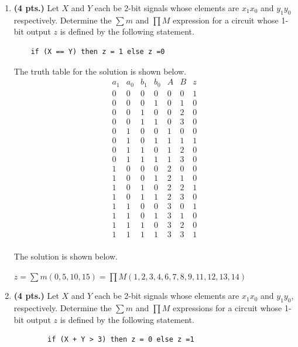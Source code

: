 \begin{enumerate}
\item {\bf (4 pts.)} Let $X$ and $Y$ each be 2-bit signals whose 
elements are $x_1 x_0$ and $y_1 y_0$ respectively.  Determine the 
$\sum m$ and $\prod M$ expression for a circuit whose 1-bit 
output $z$ is defined by the following statement.
\begin{verbatim}
	if (X == Y) then z = 1 else z =0
\end{verbatim}

\begin{solution}{
The truth table for the solution is shown below.
$$\begin{array}{c|c|c|c||c|c||c}
a_1 & a_0 & b_1 & b_0 & A  & B & z  \\ \hline
0 & 0 & 0 & 0 & 0 & 0 & 1  \\ \hline
0 & 0 & 0 & 1 & 0 & 1 & 0  \\ \hline
0 & 0 & 1 & 0 & 0 & 2 & 0  \\ \hline
0 & 0 & 1 & 1 & 0 & 3 & 0  \\ \hline
0 & 1 & 0 & 0 & 1 & 0 & 0  \\ \hline
0 & 1 & 0 & 1 & 1 & 1 & 1  \\ \hline
0 & 1 & 1 & 0 & 1 & 2 & 0  \\ \hline
0 & 1 & 1 & 1 & 1 & 3 & 0  \\ \hline
1 & 0 & 0 & 0 & 2 & 0 & 0  \\ \hline
1 & 0 & 0 & 1 & 2 & 1 & 0  \\ \hline
1 & 0 & 1 & 0 & 2 & 2 & 1  \\ \hline
1 & 0 & 1 & 1 & 2 & 3 & 0  \\ \hline
1 & 1 & 0 & 0 & 3 & 0 & 1  \\ \hline
1 & 1 & 0 & 1 & 3 & 1 & 0  \\ \hline
1 & 1 & 1 & 0 & 3 & 2 & 0  \\ \hline
1 & 1 & 1 & 1 & 3 & 3 & 1  \\
\end{array}$$

The solution is shown below.

$z = \sum m(0,5,10,15) = \prod M(1,2,3,4,6,7,8,9,11,12,13,14)$
} \end{solution}


\item {\bf (4 pts.)} Let $X$ and $Y$ each be 2-bit signals whose 
elements are $x_1 x_0$ and $y_1 y_0$, respectively.  Determine the 
$\sum m$ and $\prod M$ expressions for a circuit whose 1-bit
output $z$ is defined by the following statement.
\begin{verbatim}
        if (X + Y > 3) then z = 0 else z =1
\end{verbatim}


\end{enumerate}

